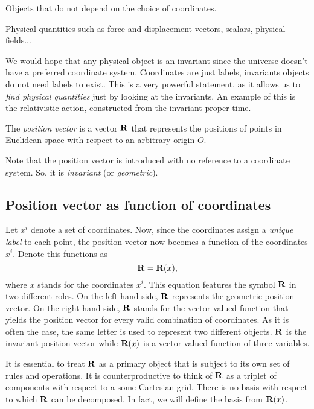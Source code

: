 \documentclass{article}
\begin{document}
	 Objects that do not depend on the choice of coordinates.
	\begin{example}[Invariants]
		Physical quantities such as force and displacement vectors, scalars, physical fields...
	\end{example}
	We would hope that any physical object is an invariant since the universe doesn't have a preferred coordinate system. Coordinates are just labels, invariants objects do not need labels to exist. This is a very powerful statement, as it allows us to \textit{find physical quantities} just by looking at the invariants. An example of this is the relativistic action, constructed from the invariant proper time.
	\begin{definition}
		The \textit{position vector} is a vector $ \vb{R} $ that represents the positions of points in Euclidean space with respect to an arbitrary origin $ O $.
	\end{definition}
	Note that the position vector is introduced with no reference to a coordinate system. So, it is \textit{invariant} (or \textit{geometric}).
	\subsection{Position vector as function of coordinates}
	Let $ x^{i} $ denote a set of coordinates. Now, since the coordinates assign a \textit{unique label} to each point, the position vector now becomes a function of the coordinates $ x^{i} $. Denote this functions as
	\begin{equation} \label{eq:11}
		\vb{R} = \vb{R}(x),
	\end{equation}
	where $ x $ stands for the coordinates $ x^{i} $. This equation features the symbol $ \vb{R} $ in two different roles. On the left-hand side, $ \vb{R} $ represents the geometric position vector. On the right-hand side, $ \vb{R} $ stands for the vector-valued function that yields the position vector for every valid combination of coordinates. As it is often the case, the same letter is used to represent two different objects. $ \vb{R} $ is the invariant position vector while $ \vb{R}(x) $ is a vector-valued function of three variables.
	\par
	It is essential to treat $ \vb{R} $ as a primary object that is subject to its own set of rules and operations. It is counterproductive to think of $ \vb{R} $ as a triplet of components with respect to a some Cartesian grid. There is no basis with respect to which $ \vb{R} $ can be decomposed. In fact, we will define the basis from $ \vb{R}(x) $.
\end{document}
